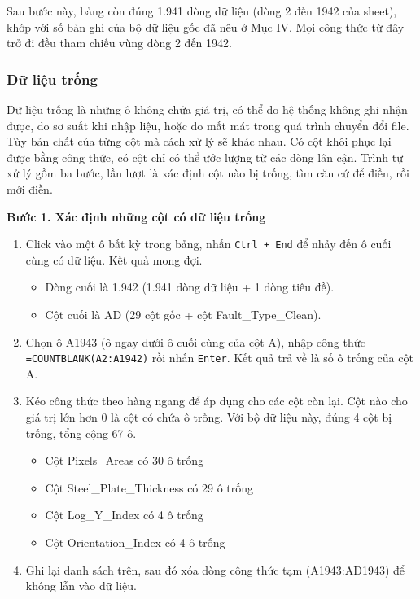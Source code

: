 \documentclass[12pt]{article}
\begin{document}
\noindent
Sau bước này, bảng còn đúng 1.941 dòng dữ liệu (dòng 2 đến 1942 của sheet), khớp với số bản ghi của bộ dữ liệu gốc đã nêu ở Mục IV. Mọi công thức từ đây trở đi đều tham chiếu vùng dòng 2 đến 1942.


\subsubsection{Dữ liệu trống}

Dữ liệu trống là những ô không chứa giá trị, có thể do hệ thống không ghi nhận được, do sơ suất khi nhập liệu, hoặc do mất mát trong quá trình chuyển đổi file. Tùy bản chất của từng cột mà cách xử lý sẽ khác nhau. Có cột khôi phục lại được bằng công thức, có cột chỉ có thể ước lượng từ các dòng lân cận. Trình tự xử lý gồm ba bước, lần lượt là xác định cột nào bị trống, tìm căn cứ để điền, rồi mới điền.

\noindent
\textbf{Bước 1. Xác định những cột có dữ liệu trống}

\begin{enumerate}
    \item Click vào một ô bất kỳ trong bảng, nhấn \texttt{Ctrl + End} để nhảy đến ô cuối cùng có dữ liệu. Kết quả mong đợi.
    \begin{itemize}
        \item Dòng cuối là 1.942 (1.941 dòng dữ liệu + 1 dòng tiêu đề).
        \item Cột cuối là AD (29 cột gốc + cột Fault\_Type\_Clean).
    \end{itemize}

    \item Chọn ô A1943 (ô ngay dưới ô cuối cùng của cột A), nhập công thức \texttt{=COUNTBLANK(A2:A1942)} rồi nhấn \texttt{Enter}. Kết quả trả về là số ô trống của cột A.

    \item Kéo công thức theo hàng ngang để áp dụng cho các cột còn lại. Cột nào cho giá trị lớn hơn 0 là cột có chứa ô trống. Với bộ dữ liệu này, đúng 4 cột bị trống, tổng cộng 67 ô.
    \begin{itemize}
        \item Cột Pixels\_Areas có 30 ô trống
        \item Cột Steel\_Plate\_Thickness có 29 ô trống
        \item Cột Log\_Y\_Index có 4 ô trống
        \item Cột Orientation\_Index có 4 ô trống
    \end{itemize}

    \item Ghi lại danh sách trên, sau đó xóa dòng công thức tạm (A1943:AD1943) để không lẫn vào dữ liệu.
\end{enumerate}
\end{document}
